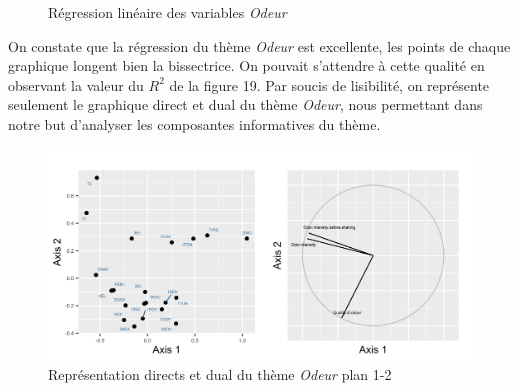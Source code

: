 \documentclass[a4paper,french,10pt]{article}
\begin{document}
\begin{figure}[htp]
{	}%
	\hfill%
	\caption{Régression linéaire des variables \textit{Odeur}}
\end{figure}

\newpage

On constate que la régression du thème \textit{Odeur} est excellente, les points de chaque graphique longent bien la bissectrice. On pouvait s'attendre à cette qualité en observant la valeur du $R^2$ de la figure 19. \newline 
Par soucis de lisibilité, on représente seulement le graphique direct et dual du thème \textit{Odeur}, nous permettant dans notre but d'analyser les composantes informatives du thème. 

\begin{figure}[htp] 
	\centering
	\includegraphics[scale=0.8]{images/Plot.IndVar_Cross_B1_1.2.png}
	\caption{Représentation directs et dual du thème \textit{Odeur} plan 1-2}
\end{figure}
\end{document}
